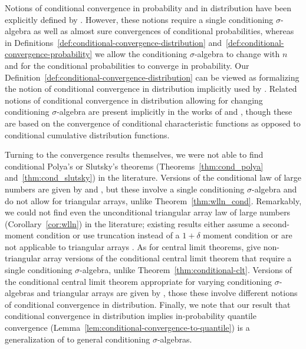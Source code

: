 \documentclass[12pt]{article}
\theoremstyle{definition}
\theoremstyle{remark}
\begin{document}
Notions of conditional convergence in probability and in distribution have been explicitly defined by \citet{Nowak2005}. However, these notions require a single conditioning $\sigma$-algebra as well as almost sure convergences of conditional probabilities, whereas in Definitions~\ref{def:conditional-convergence-distribution} and~\ref{def:conditional-convergence-probability} we allow the conditioning $\sigma$-algebra to change with $n$ and for the conditional probabilities to converge in probability. Our Definition~\ref{def:conditional-convergence-distribution} can be viewed as formalizing the notion of conditional convergence in distribution implicitly used by \citet{Wang2020b}. Related notions of conditional convergence in distribution allowing for changing conditioning $\sigma$-algebra are present implicitly in the works of \citet{Dedecker2002} and \citet{bulinski2017conditional}, though these are based on the convergence of conditional characteristic functions as opposed to conditional cumulative distribution functions. %

Turning to the convergence results themselves, we were not able to find conditional Polya's or Slutsky's theorems (Theorems~\ref{thm:cond_polya} and~\ref{thm:cond_slutsky}) in the literature. Versions of the conditional law of large numbers are given by \cite{Majerek2005a} and \cite{PrakasaRao2009}, but these involve a single conditioning $\sigma$-algebra and do not allow for triangular arrays, unlike Theorem~\ref{thm:wlln_cond}. Remarkably, we could not find even the unconditional triangular array law of large numbers (Corollary~\ref{cor:wlln}) in the literature; existing results either assume a second-moment condition or use truncation \citep[Theorems 2.2.4 and 2.2.6, respectively]{Durrett2010} instead of a $1+\delta$ moment condition or are not applicable to triangular arrays \citep[Lemma 19]{Shah2018}. As for central limit theorems, \citet{Grzenda2008, PrakasaRao2009, Yuan2014} give non-triangular array versions of the conditional central limit theorem that require a single conditioning $\sigma$-algebra, unlike Theorem~\ref{thm:conditional-clt}. Versions of the conditional central limit theorem appropriate for varying conditioning $\sigma$-algebras and triangular arrays are given by \citet{Dedecker2002, bulinski2017conditional}, those these involve different notions of conditional convergence in distribution. %
Finally, we note that our result that conditional convergence in distribution implies in-probability quantile convergence (Lemma~\ref{lem:conditional-convergence-to-quantile}) is a generalization of \citet[Lemma 3]{Wang2020b} to general conditioning $\sigma$-algebras.
\end{document}

